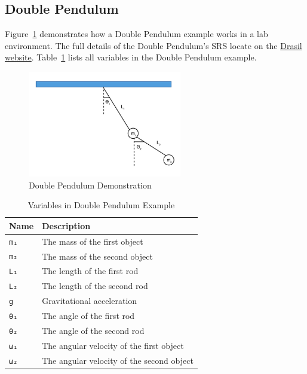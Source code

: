 \subsection{Double Pendulum}
\label{se_dblpen}
Figure~\ref{fig_dblpen} demonstrates how a Double Pendulum example works in a lab environment. The full details of the Double Pendulum's SRS locate on the \href{https://jacquescarette.github.io/Drasil/examples/dblpendulum/SRS/srs/DblPendulum_SRS.html}{Drasil website}. Table~\ref{tab_dblpendes} lists all variables in the Double Pendulum example.
\begin{figure}[ht]
  \centering
  \includegraphics[width=0.6\textwidth]{figures/DblPendulum.png}
  \caption{Double Pendulum Demonstration}
  \label{fig_dblpen}
\end{figure}

\begin{table}[ht]
	\begin{tabular}{ p{} p{} }
		\textbf{Name} & \textbf{Description} \\
		\toprule
		\verb|m₁| & The mass of the first object\\
    \verb|m₂| & The mass of the second object\\
		\verb|L₁| & The length of the first rod\\
		\verb|L₂| & The length of the second rod\\
		\verb|g| & Gravitational acceleration\\
		\verb|θ₁| & The angle of the first rod\\
		\verb|θ₂| & The angle of the second rod\\
		\verb|ω₁| & The angular velocity of the first object\\
		\verb|ω₂| & The angular velocity of the second object\\
		\bottomrule	
	\end{tabular}	
	\caption{Variables in Double Pendulum Example}	
	\label{tab_dblpendes}
\end{table}

